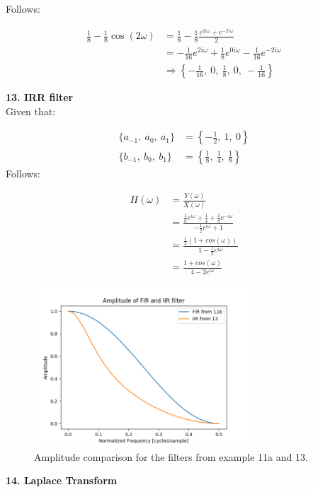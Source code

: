 Follows:

\begin{align*}
	\frac{1}{8} - \frac{1}{8} \cos(2\omega) &= \frac{1}{8} - \frac{1}{8} \frac{e^{2i\omega} + e^{-2i\omega}}{2} \\ 
	&= -\frac{1}{16} e^{2i\omega} + \frac{1}{8} e^{0i\omega} - \frac{1}{16} e^{-2i\omega} \\
	&\Rightarrow \left\{ -\frac{1}{16},\ 0,\ \frac{1}{8},\ 0,\ -\frac{1}{16} \right\}
\end{align*}

\textbf{\large 13. IRR filter}
\\

Given that:

\begin{align}
	\{a_{-1},\ a_0,\ a_1\} &= \left\{-\frac{1}{2},\ 1,\ 0\right\} \\
	\{b_{-1},\ b_0,\ b_1\} &= \left\{\frac{1}{8},\ \frac{1}{4},\ \frac{1}{8}\right\}
\end{align}
Follows:

\begin{align*}
	H(\omega) &= \frac{Y(\omega)}{X(\omega)}\\
	&= \frac{\frac{1}{8} e^{i\omega} + \frac{1}{4} + \frac{1}{8} e^{-i\omega}}{-\frac{1}{2} e^{i\omega} + 1}\\
	&= \frac{\frac{1}{4} (1 + cos(\omega))}{1 - \frac{1}{2} e^{i\omega}}\\
	&= \frac{1 + cos(\omega)}{4 - 2 e^{i\omega}}
\end{align*}

\begin{figure}[h]
	\centering
	\includegraphics[width=8cm]{img/ex_13.png}
	\captionsetup{width=6cm}
	\caption{Amplitude comparison for the filters from example 11a and 13.}
\end{figure}

\newpage
\textbf{\large 14. Laplace Transform}
\\

